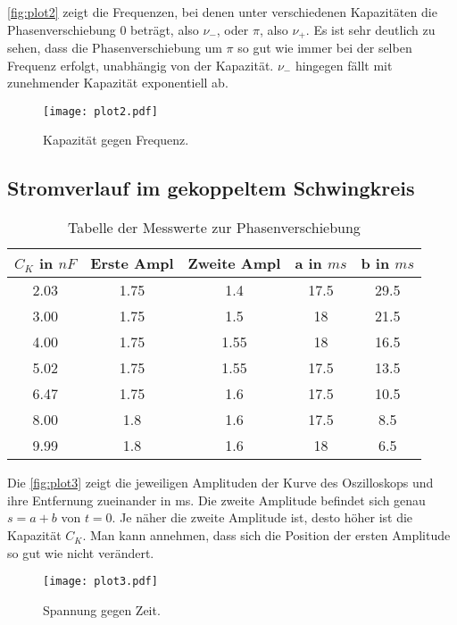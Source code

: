 \autoref{fig:plot2} zeigt die Frequenzen, bei denen unter verschiedenen Kapazitäten die Phasenverschiebung 0 beträgt, also \(\nu_-\), oder \(\pi\), also \(\nu_+\).
Es ist sehr deutlich zu sehen, dass die Phasenverschiebung um \(\pi\) so gut wie immer bei der selben Frequenz erfolgt, unabhängig von der Kapazität.
\(\nu_-\) hingegen fällt mit zunehmender Kapazität exponentiell ab.
\begin{figure}
  \centering
  \texttt{[image: plot2.pdf]}
  \caption{Kapazität gegen Frequenz.}
  \label{fig:plot2}
\end{figure}
\newpage
\subsection{Stromverlauf im gekoppeltem Schwingkreis}

\begin{table}
  \centering
  \caption{Tabelle der Messwerte zur Phasenverschiebung}
  \label{tab:tab2}
  \begin{tabular}{c c c c c}
    \toprule
    \(C_K\) in $nF$ & Erste Ampl & Zweite Ampl & a in $ms$ & b in $ms$\\
    \midrule
    2.03 & 1.75 & 1.4 & 17.5 & 29.5\\
    3.00 & 1.75 & 1.5 & 18 & 21.5\\
    4.00 & 1.75 & 1.55 & 18 & 16.5\\
    5.02 & 1.75 & 1.55 & 17.5 & 13.5\\
    6.47 & 1.75 & 1.6 & 17.5 & 10.5\\
    8.00 & 1.8 & 1.6 & 17.5 & 8.5\\
    9.99 & 1.8 & 1.6 & 18 & 6.5\\
    \bottomrule
  \end{tabular}
\end{table}

Die \autoref{fig:plot3} zeigt die jeweiligen Amplituden der Kurve des Oszilloskops und ihre Entfernung zueinander in ms.
Die zweite Amplitude befindet sich genau \(s = a + b\) von \(t = 0\).
Je näher die zweite Amplitude ist, desto höher ist die Kapazität \(C_K\).
Man kann annehmen, dass sich die Position der ersten Amplitude so gut wie nicht verändert.
\begin{figure}
  \centering
  \texttt{[image: plot3.pdf]}
  \caption{Spannung gegen Zeit.}
  \label{fig:plot3}
\end{figure}